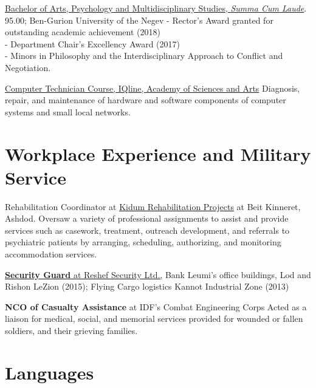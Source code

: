 {\href{https://github.com/kiril-u/kiril-resume-2021-1/blob/main/references/BA-and-honorary.pdf}{Bachelor of Arts, Psychology and Multidisciplinary Studies, \textit{Summa Cum Laude}}. 95.00; Ben-Gurion University of the Negev}
{- Rector's Award granted for outstanding academic achievement (2018) \\
- Department Chair’s Excellency Award (2017) \\
- Minors in Philosophy and the Interdisciplinary Approach to Conflict and Negotiation.}
{}
\par{\par}

{\href{https://raw.githubusercontent.com/kiril-u/kiril-resume-2021-1/main/references/computer-technitian-certificate.jpg}{Computer Technician Course, IQline, Academy of Sciences and Arts}}
{Diagnosis, repair, and maintenance of hardware and software components of computer systems and small local networks.}
{}

\section{Workplace Experience and Military Service}

{Rehabilitation Coordinator at \href{http://www.kidumpro.co.il/}{Kidum Rehabilitation Projects} at Beit Kinneret, Ashdod.}
{Oversaw a variety of professional assignments to assist and provide services such as casework, treatment, outreach development, and referrals to psychiatric patients by arranging, scheduling, authorizing, and monitoring accommodation services.}
{}

{\href{https://raw.githubusercontent.com/kiril-u/kiril-resume-2021-1/main/references/recommendation-letter-security-guard.jpg}{\textbf{Security Guard} at Reshef Security Ltd.,}} 
{Bank Leumi's office buildings, Lod and Rishon LeZion (2015);
Flying Cargo logistics Kannot Industrial Zone (2013)}
{}

{\textbf{NCO of Casualty Assistance} at IDF's Combat Engineering Corps} 
{Acted as a liaison for medical, social, and memorial services provided for wounded or fallen soldiers, and their grieving families.}
{}

\section{Languages}

